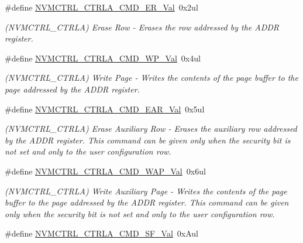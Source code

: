 \begin{DoxyCompactItemize}
\item 
\#define \mbox{\hyperlink{group___s_a_m_d21___n_v_m_c_t_r_l_ga6c7936d9e4cd317170b54ffb5b3b428d}{N\+V\+M\+C\+T\+R\+L\+\_\+\+C\+T\+R\+L\+A\+\_\+\+C\+M\+D\+\_\+\+E\+R\+\_\+\+Val}}~0x2ul
\begin{DoxyCompactList}\small\item\em (N\+V\+M\+C\+T\+R\+L\+\_\+\+C\+T\+R\+LA) Erase Row -\/ Erases the row addressed by the A\+D\+DR register. \end{DoxyCompactList}\item 
\#define \mbox{\hyperlink{group___s_a_m_d21___n_v_m_c_t_r_l_gad7cfc5fc0cd04b2bbe3337a035b6d127}{N\+V\+M\+C\+T\+R\+L\+\_\+\+C\+T\+R\+L\+A\+\_\+\+C\+M\+D\+\_\+\+W\+P\+\_\+\+Val}}~0x4ul
\begin{DoxyCompactList}\small\item\em (N\+V\+M\+C\+T\+R\+L\+\_\+\+C\+T\+R\+LA) Write Page -\/ Writes the contents of the page buffer to the page addressed by the A\+D\+DR register. \end{DoxyCompactList}\item 
\#define \mbox{\hyperlink{group___s_a_m_d21___n_v_m_c_t_r_l_ga07c4451d3f3e0d0dbed551ef0c3bbd21}{N\+V\+M\+C\+T\+R\+L\+\_\+\+C\+T\+R\+L\+A\+\_\+\+C\+M\+D\+\_\+\+E\+A\+R\+\_\+\+Val}}~0x5ul
\begin{DoxyCompactList}\small\item\em (N\+V\+M\+C\+T\+R\+L\+\_\+\+C\+T\+R\+LA) Erase Auxiliary Row -\/ Erases the auxiliary row addressed by the A\+D\+DR register. This command can be given only when the security bit is not set and only to the user configuration row. \end{DoxyCompactList}\item 
\#define \mbox{\hyperlink{group___s_a_m_d21___n_v_m_c_t_r_l_ga16088beab7d82fdbb34bac9971d21859}{N\+V\+M\+C\+T\+R\+L\+\_\+\+C\+T\+R\+L\+A\+\_\+\+C\+M\+D\+\_\+\+W\+A\+P\+\_\+\+Val}}~0x6ul
\begin{DoxyCompactList}\small\item\em (N\+V\+M\+C\+T\+R\+L\+\_\+\+C\+T\+R\+LA) Write Auxiliary Page -\/ Writes the contents of the page buffer to the page addressed by the A\+D\+DR register. This command can be given only when the security bit is not set and only to the user configuration row. \end{DoxyCompactList}\item 
\#define \mbox{\hyperlink{group___s_a_m_d21___n_v_m_c_t_r_l_ga37bc89b225c1b5d5a07bc707ef910ecb}{N\+V\+M\+C\+T\+R\+L\+\_\+\+C\+T\+R\+L\+A\+\_\+\+C\+M\+D\+\_\+\+S\+F\+\_\+\+Val}}~0x\+Aul

\end{DoxyCompactItemize}
